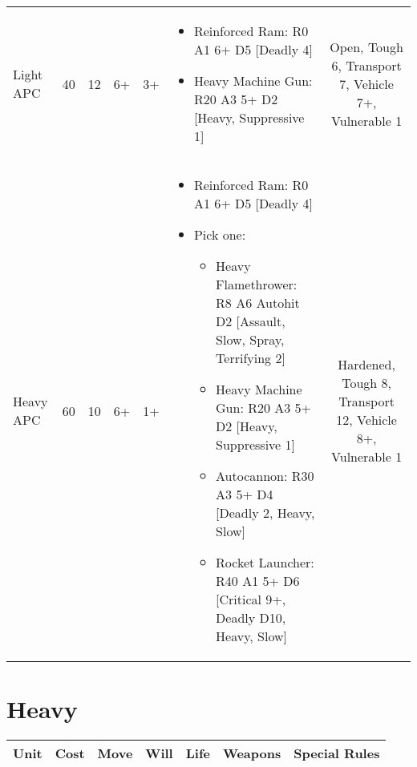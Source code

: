 \documentclass[landscape]{extarticle}
\begin{document}
\begin{small}
\begin{tabular}{UccccWS}
\hline


Light APC
&
40
&
12
&
6+
&
3+
&
\begin{itemize}
    \item Reinforced Ram: R0 A1 6+ D5 [Deadly 4]
    \item Heavy Machine Gun: R20 A3 5+ D2 [Heavy, Suppressive 1]
\end{itemize}
&
Open, Tough 6, Transport 7, Vehicle 7+, Vulnerable 1



\\



Heavy APC
&
60
&
10      
&
6+
&
1+
&
\begin{itemize}
    \item Reinforced Ram: R0 A1 6+ D5 [Deadly 4]
    \item Pick one:
    \begin{itemize}
        \item Heavy Flamethrower: R8 A6 Autohit D2 [Assault, Slow, Spray, Terrifying 2]
        \item Heavy Machine Gun: R20 A3 5+ D2 [Heavy, Suppressive 1]
        \item Autocannon: R30 A3 5+ D4 [Deadly 2, Heavy, Slow]
        \item Rocket Launcher: R40 A1 5+ D6 [Critical 9+, Deadly D10, Heavy, Slow]
    \end{itemize}
\end{itemize}
&
Hardened, Tough 8, Transport 12, Vehicle 8+, Vulnerable 1
\end{tabular}







\section*{Heavy}

\begin{tabular}{UccccWS}

\textbf{Unit} & \textbf{Cost} & \textbf{Move} & \textbf{Will} & \textbf{Life} & \textbf{Weapons} & \textbf{Special Rules} \\


\hline



\end{tabular}
\end{small}
\end{document}
